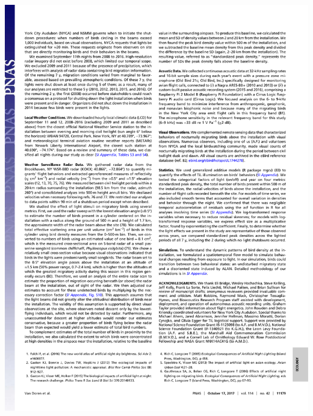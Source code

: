 \documentclass[a4paper, twoside]{templates/ociamthesis}
\begin{document}
\begin{center}\includegraphics[width=1\linewidth]{pdf_chapters/lights/lights_crop_Part5} \end{center}
\end{document}
